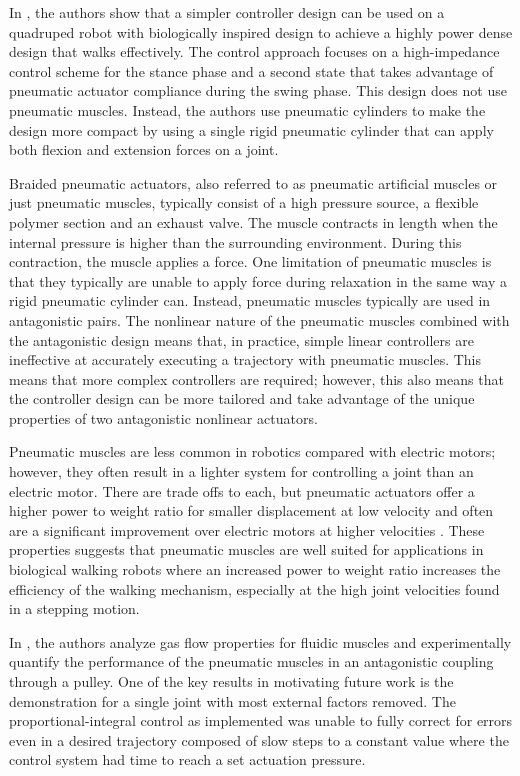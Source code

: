 In \cite{Wait2014}, the authors show that a simpler controller design can be
used on a quadruped robot with biologically inspired design to achieve a highly
power dense design that walks effectively. The control approach focuses on
a high-impedance control scheme for the stance phase and a second state
that takes advantage of pneumatic actuator compliance during the swing phase.
This design does not use pneumatic muscles. Instead, the authors use pneumatic
cylinders to make the design more compact by using a single rigid pneumatic cylinder that can apply both
flexion and extension forces on a joint. 


Braided pneumatic actuators, also referred to as pneumatic artificial muscles or just pneumatic muscles, typically consist of a high pressure source, a
flexible polymer section and an exhaust valve. The muscle contracts in length
when the internal pressure is higher than the surrounding environment. During
this contraction, the muscle applies a force. One limitation of pneumatic
muscles is that they typically are unable to apply force during relaxation in
the same way a rigid pneumatic cylinder can. Instead, pneumatic muscles typically are used in
antagonistic pairs. The nonlinear nature of the pneumatic muscles combined with the
antagonistic design means that, in practice, simple linear controllers are
ineffective at accurately executing a trajectory with pneumatic muscles. This means that more complex controllers are required; however,
this also means that the controller design can be more tailored and take
advantage of the unique properties of two antagonistic nonlinear actuators.

Pneumatic muscles are less common in robotics compared with electric motors;
however,
they often result in a lighter system for controlling a joint than an
electric motor. There are trade offs to each, but pneumatic actuators offer a
higher power to weight ratio for smaller displacement at low velocity and
often are a significant improvement over electric motors at higher velocities \cite{Tavakoli2008}. These properties suggests that pneumatic muscles are well suited for applications in
biological walking robots where an increased power to weight ratio increases
the efficiency of the walking mechanism, especially at the high joint velocities
found in a stepping motion.


In \cite{Situm2008}, the authors analyze gas flow properties for fluidic muscles
and experimentally quantify the performance of the pneumatic muscles in an antagonistic coupling
through a pulley. One of the key results in \cite{Situm2008} motivating future work is the
demonstration for a single joint with most external factors removed. The
proportional-integral control as implemented was unable to fully correct for
errors even in a desired trajectory composed of slow steps to a constant value
where the control system had time to reach a set actuation pressure.

